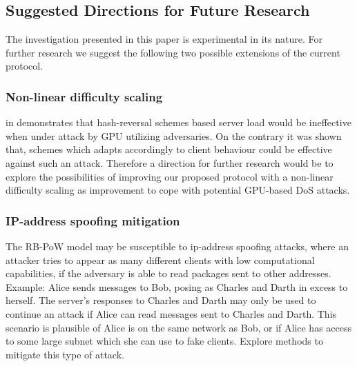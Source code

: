 \subsection{Suggested Directions for Future Research}
The investigation presented in this paper is experimental in its nature. For further research we suggest the following two possible extensions of the current protocol.

\subsubsection{Non-linear difficulty scaling}
 \citeauthor{Green} in  demonstrates that hash-reversal schemes based server load would be ineffective when under attack by GPU utilizing adversaries. On the contrary it was shown that, schemes which adapts accordingly to client behaviour could be effective against such an attack. Therefore a direction for further research would be to explore the possibilities of improving our proposed protocol with a non-linear difficulty scaling as improvement to cope with potential GPU-based DoS attacks. 

\subsubsection{IP-address spoofing mitigation}
The RB-PoW model may be susceptible to ip-address spoofing attacks, where an attacker tries to appear as many different clients with low computational capabilities, if the adversary is able to read packages sent to other addresses. Example: Alice sends messages to Bob, posing as Charles and Darth in excess to herself. The server's responses to Charles and Darth may only be used to continue an attack if Alice can read messages sent to Charles and Darth. This scenario is plausible of Alice is on the same network as Bob, or if Alice has access to some large subnet which she can use to fake clients. Explore methods to mitigate this type of attack. 

 

